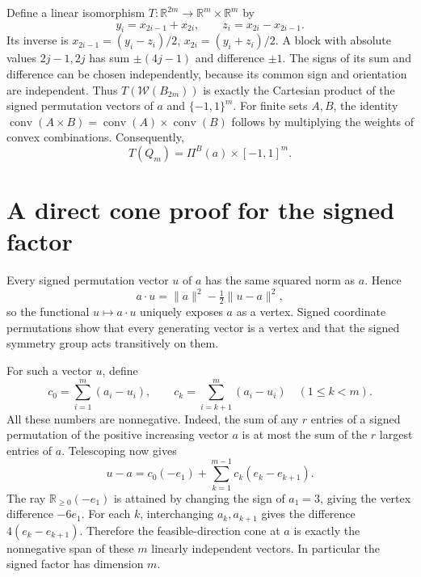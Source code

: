 \documentclass[11pt]{article}
\newcommand{\conv}{\operatorname{conv}}
\newcommand{\W}{\mathcal W}
\begin{document}
Define a linear isomorphism $T:\mathbb R^{2m}\to\mathbb R^m\times\mathbb R^m$
by
\begin{equation}\label{map}
 y_i=x_{2i-1}+x_{2i},\qquad z_i=x_{2i}-x_{2i-1}.
\end{equation}
Its inverse is $x_{2i-1}=(y_i-z_i)/2$, $x_{2i}=(y_i+z_i)/2$.
A block with absolute values $2j-1,2j$ has sum $\pm(4j-1)$ and
difference $\pm1$. The signs of its sum and difference can be chosen
independently, because its common sign and orientation are independent.
Thus $T(\W(B_{2m}))$ is exactly the Cartesian product of the signed
permutation vectors of $a$ and $\{-1,1\}^m$.
For finite sets $A,B$, the identity
$\conv(A\times B)=\conv(A)\times\conv(B)$ follows by multiplying
the weights of convex combinations. Consequently,
\begin{equation}\label{product}
 T(Q_m)=\Pi^B(a)\times[-1,1]^m.
\end{equation}

\section*{A direct cone proof for the signed factor}
Every signed permutation vector $u$ of $a$ has the same squared norm
as $a$. Hence
\[
 a\cdot u=\|a\|^2-\tfrac12\|u-a\|^2,
\]
so the functional $u\mapsto a\cdot u$ uniquely exposes $a$ as a vertex.
Signed coordinate permutations show that every generating vector is a
vertex and that the signed symmetry group acts transitively on them.

For such a vector $u$, define
\[
 c_0=\sum_{i=1}^m(a_i-u_i),\qquad
 c_k=\sum_{i=k+1}^m(a_i-u_i)\quad(1\leq k<m).
\]
All these numbers are nonnegative. Indeed, the sum of any $r$ entries
of a signed permutation of the positive increasing vector $a$ is at most
the sum of the $r$ largest entries of $a$. Telescoping now gives
\begin{equation}\label{cone}
 u-a=c_0(-e_1)+\sum_{k=1}^{m-1}c_k(e_k-e_{k+1}).
\end{equation}
The ray $\mathbb R_{\geq0}(-e_1)$ is attained by changing the sign of
$a_1=3$, giving the vertex difference $-6e_1$.
For each $k$, interchanging $a_k,a_{k+1}$ gives the difference
$4(e_k-e_{k+1})$. Therefore the feasible-direction cone at $a$ is
exactly the nonnegative span of these $m$ linearly independent vectors.
In particular the signed factor has dimension $m$.
\end{document}
